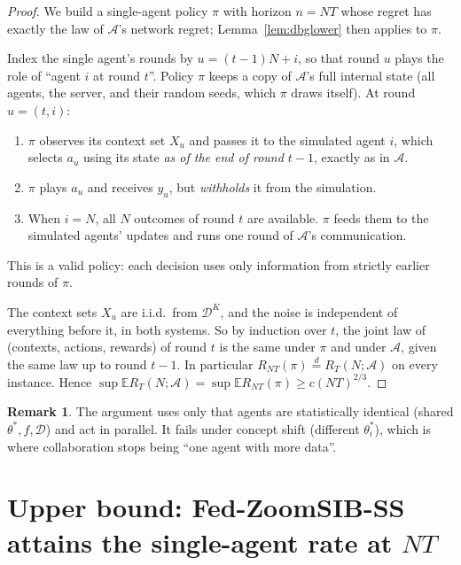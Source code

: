 \documentclass[11pt]{article}
\theoremstyle{definition}
\newtheorem{remark}[theorem]{Remark}
\newcommand{\E}{\mathbb{E}}
\begin{document}
\begin{proof}
We build a single-agent policy $\pi$ with horizon $n=NT$ whose regret has exactly the law of
$\mathcal A$'s network regret; Lemma~\ref{lem:dbglower} then applies to $\pi$.

Index the single agent's rounds by $u=(t-1)N+i$, so that round $u$ plays the role of
``agent $i$ at round $t$''. Policy $\pi$ keeps a copy of $\mathcal A$'s full internal state
(all agents, the server, and their random seeds, which $\pi$ draws itself). At round $u=(t,i)$:
\begin{enumerate}[nosep]
\item $\pi$ observes its context set $X_u$ and passes it to the simulated agent $i$, which
selects $a_u$ using its state \emph{as of the end of round $t-1$}, exactly as in $\mathcal A$.
\item $\pi$ plays $a_u$ and receives $y_u$, but \emph{withholds} it from the simulation.
\item When $i=N$, all $N$ outcomes of round $t$ are available. $\pi$ feeds them to the simulated
agents' updates and runs one round of $\mathcal A$'s communication.
\end{enumerate}
This is a valid policy: each decision uses only information from strictly earlier rounds of
$\pi$.

The context sets $X_u$ are i.i.d.\ from $\mathcal D^K$, and the noise is independent of
everything before it, in both systems. So by induction over $t$, the joint law of
(contexts, actions, rewards) of round $t$ is the same under $\pi$ and under $\mathcal A$, given
the same law up to round $t-1$. In particular $R_{NT}(\pi)\overset{d}{=}R_T(N;\mathcal A)$ on every
instance. Hence
$\sup\E R_T(N;\mathcal A)=\sup\E R_{NT}(\pi)\ge c(NT)^{2/3}$.
\end{proof}

\begin{remark}
The argument uses only that agents are statistically identical (shared $\theta^*,f,\mathcal D$)
and act in parallel. It fails under concept shift (different $\theta^*_i$), which is where
collaboration stops being ``one agent with more data''.
\end{remark}

\section{Upper bound: Fed-ZoomSIB-SS attains the single-agent rate at $NT$}
\end{document}
